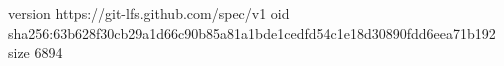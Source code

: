 version https://git-lfs.github.com/spec/v1
oid sha256:63b628f30cb29a1d66c90b85a81a1bde1cedfd54c1e18d30890fdd6eea71b192
size 6894
